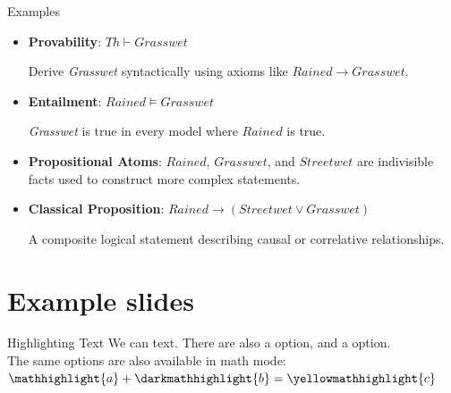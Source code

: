\documentclass{beamer} %
\begin{document}
\begin{frame}{Examples}
    \begin{itemize}
        \item \textbf{Provability}: $ Th \vdash Grasswet $ \par
        Derive \textit{Grasswet} syntactically using axioms like $ Rained \rightarrow Grasswet $.
        
        \item \textbf{Entailment}:  $ Rained \vDash Grasswet $ \par
        \textit{Grasswet} is true in every model where \( Rained \) is true.
        
        \item \textbf{Propositional Atoms}:
        \( Rained \), \( Grasswet \), and \( Streetwet \) are indivisible facts used to construct more complex statements.
        
        \item \textbf{Classical Proposition}: $ Rained \rightarrow (Streetwet \lor Grasswet) $ \par
        A composite logical statement describing causal or correlative relationships.
    \end{itemize}
\end{frame}



\section{Example slides}

\begin{frame}{Highlighting Text}
    We can  text. There are also a  option, and a  option.\\
    The same options are also available in math mode: $\mathhighlight{a} + \darkmathhighlight{b} = \yellowmathhighlight{c}$
\end{frame}
\end{document}
